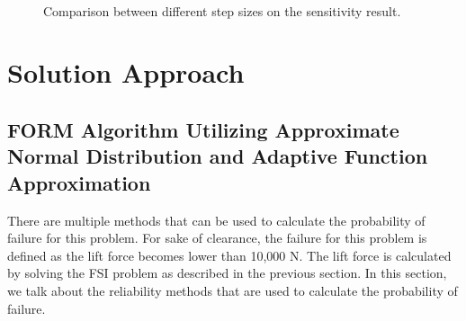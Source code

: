 \documentclass[paper=a4, fontsize=12pt]{scrartcl} %
\begin{document}
\begin{figure}[H]
{		\label{fig:results_hist}
		}
		\\
		\quad
		\caption{Comparison between different step sizes on the sensitivity result.}
		\label{fig:sensitivity_FD_stepsize}
	\end{figure}
%
\section{Solution Approach}\label{sec:solutionApproach}
\subsection{FORM Algorithm Utilizing Approximate Normal Distribution and Adaptive Function Approximation}
There are multiple methods that can be used to calculate the probability of failure for this problem. For sake of clearance, the failure for this problem is defined as the lift force becomes lower than 10,000 N. The lift force is calculated by solving the FSI problem as described in the previous section. In this section, we talk about the reliability methods that are used to calculate the probability of failure.\\
\end{document}
